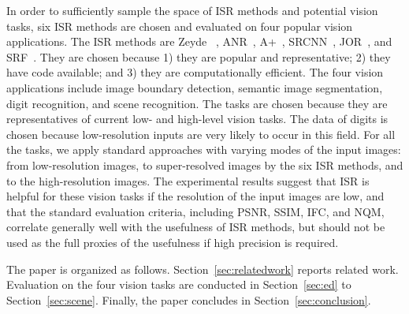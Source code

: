 \documentclass[10pt,twocolumn,letterpaper]{article}
\begin{document}

In order to sufficiently sample the space of ISR methods and potential
vision tasks, six ISR methods are chosen and evaluated on four popular
vision applications. The ISR methods are Zeyde
\etal~\cite{Zeyde-CS-2012}, ANR~\cite{Timofte-ICCV-2013},
A+~\cite{Timofte-ACCV-2014}, SRCNN~\cite{Dong-ECCV-2014}, 
JOR~\cite{JOR:EG15}, and SRF~\cite{SR_forest}.
They are chosen because 1) they are popular and representative; 
2) they have code available; and 3) they are computationally efficient.  
The four vision applications include image boundary detection, semantic image segmentation, 
digit recognition, and scene recognition. The tasks are chosen because they are representatives of
current low- and high-level vision tasks. The data of digits is chosen because low-resolution 
inputs are very likely to occur in this field. For all the tasks, we apply 
standard approaches with varying modes of the input images: from
low-resolution images, to super-resolved images by
the six ISR methods, and to the high-resolution images. The experimental
results suggest that ISR is helpful for these vision
tasks if the resolution of the input images are low, and that the
standard evaluation criteria, including PSNR, SSIM, IFC, and NQM, correlate generally well with
the usefulness of ISR methods, but should not be used as the full proxies of the usefulness 
if high precision is required.

The paper is organized as follows. Section~\ref{sec:relatedwork}
reports related work. Evaluation on the four vision tasks are
conducted in Section~\ref{sec:ed} to Section~\ref{sec:scene}. Finally,
the paper concludes in Section~\ref{sec:conclusion}.
\end{document}
